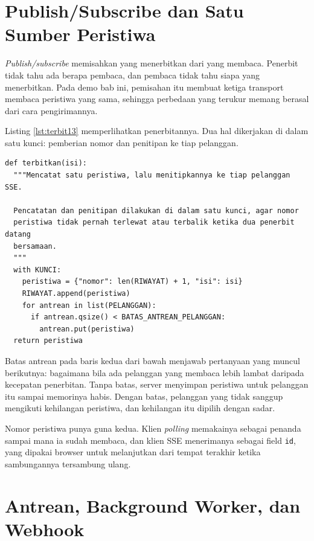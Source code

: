 \section{Publish/Subscribe dan Satu Sumber Peristiwa}

\textit{Publish/subscribe} memisahkan yang menerbitkan dari yang membaca.
Penerbit tidak tahu ada berapa pembaca, dan pembaca tidak tahu siapa yang
menerbitkan. Pada demo bab ini, pemisahan itu membuat ketiga transport
membaca peristiwa yang sama, sehingga perbedaan yang terukur memang berasal
dari cara pengirimannya.

Listing \ref{lst:terbit13} memperlihatkan penerbitannya. Dua hal dikerjakan
di dalam satu kunci: pemberian nomor dan penitipan ke tiap pelanggan.

\begin{lstlisting}[style=PythonStyle, caption={Satu penerbitan, banyak pelanggan, tersedia di \berkas{sources/chapter13/aplikasi.py}}, label={lst:terbit13}]
def terbitkan(isi):
  """Mencatat satu peristiwa, lalu menitipkannya ke tiap pelanggan SSE.

  Pencatatan dan penitipan dilakukan di dalam satu kunci, agar nomor
  peristiwa tidak pernah terlewat atau terbalik ketika dua penerbit datang
  bersamaan.
  """
  with KUNCI:
    peristiwa = {"nomor": len(RIWAYAT) + 1, "isi": isi}
    RIWAYAT.append(peristiwa)
    for antrean in list(PELANGGAN):
      if antrean.qsize() < BATAS_ANTREAN_PELANGGAN:
        antrean.put(peristiwa)
  return peristiwa
\end{lstlisting}

Batas antrean pada baris kedua dari bawah menjawab pertanyaan yang muncul
berikutnya: bagaimana bila ada pelanggan yang membaca lebih lambat daripada
kecepatan penerbitan. Tanpa batas, server menyimpan peristiwa untuk pelanggan
itu sampai memorinya habis. Dengan batas, pelanggan yang tidak sanggup
mengikuti kehilangan peristiwa, dan kehilangan itu dipilih dengan sadar.

Nomor peristiwa punya guna kedua. Klien \textit{polling} memakainya sebagai
penanda sampai mana ia sudah membaca, dan klien SSE menerimanya sebagai field
\texttt{id}, yang dipakai browser untuk melanjutkan dari tempat terakhir
ketika sambungannya tersambung ulang.

\section{Antrean, Background Worker, dan Webhook}

